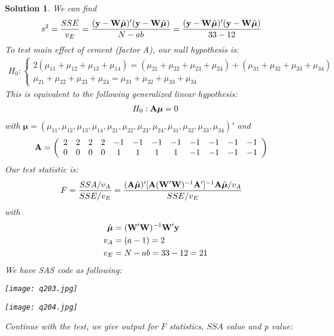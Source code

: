 \documentclass[11pt]{article}
\newtheorem{sol}{Solution}
\begin{document}
\begin{sol}
	We can find
	\begin{align*}
		s^2 &= \frac{SSE}{v_E} = \frac{({\bf y} - {\bf W}\hat{{\bm \mu}})'({\bf y} - {\bf W}\hat{{\bm \mu}})}{N - ab} = \frac{({\bf y} - {\bf W}\hat{{\bm \mu}})'({\bf y} - {\bf W}\hat{{\bm \mu}})}{33 - 12} 
	\end{align*}
	To test main effect of cement (factor A), our null hypothesis is:
	\begin{align*}
		H_0: \left \{\begin{array}{l}2(\mu_{11} + \mu_{12} + \mu_{13} + \mu_{14}) = (\mu_{21} + \mu_{22} + \mu_{23} + \mu_{24}) + (\mu_{31} + \mu_{32} + \mu_{33} + \mu_{34}) \\ \mu_{21} + \mu_{22} + \mu_{23} + \mu_{24} = \mu_{31} + \mu_{32} + \mu_{33} + \mu_{34} \end{array}\right.
	\end{align*}
	This is equivalent to the following generalized linear hypothesis:
	\begin{align*}
		H_0: {\bf A}{\bm\mu} = 0
	\end{align*}
	with ${\bm\mu} = (\mu_{11}, \mu_{12}, \mu_{13}, \mu_{14}, \mu_{21}, \mu_{22}, \mu_{23}, \mu_{24}, \mu_{31}, \mu_{32}, \mu_{33}, \mu_{34})' $ and
	\begin{align*}
		{\bf A} &= \left(\begin{array}{cccccccccccc} 2&2&2&2&-1&-1&-1&-1&-1&-1&-1&-1\\ 0 &0&0&0&1&1&1&1&-1&-1&-1&-1\end{array}\right)
	\end{align*}
	Our test statistic is:
	\begin{align*}
		F &= \frac{SSA/v_{A}}{SSE/v_E}= \frac{({\bf A}\hat{{\bm\mu}})'[{\bf A}({\bf W}'{\bf W})^{-1}{\bf A}']^{-1}{\bf A}\hat{{\bm\mu}}/v_{A}}{SSE/v_E}
	\end{align*}
	with 
	\begin{align*}
		\hat{{\bm\mu}} &= ({\bf W}'{\bf W})^{-1}{\bf W}'{\bf y}\\
		v_{A} &= (a - 1) = 2 \\
		v_{E} &= N - ab = 33 - 12 = 21
	\end{align*}
	We have SAS code as following:
	\begin{center}
		\texttt{[image: q203.jpg]}
	\end{center}
	\begin{center}
		\texttt{[image: q204.jpg]}
	\end{center}
	Continue with the test, we give output for $F$ statistics, $SSA$ value and p value:

\end{sol}
\end{document}
